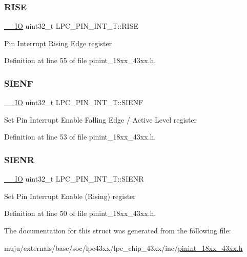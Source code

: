 \subsubsection{\texorpdfstring{R\+I\+SE}{RISE}}
{\footnotesize\ttfamily \hyperlink{core__sc300_8h_aec43007d9998a0a0e01faede4133d6be}{\+\_\+\+\_\+\+IO} uint32\+\_\+t L\+P\+C\+\_\+\+P\+I\+N\+\_\+\+I\+N\+T\+\_\+\+T\+::\+R\+I\+SE}

Pin Interrupt Rising Edge register 

Definition at line 55 of file pinint\+\_\+18xx\+\_\+43xx.\+h.

\mbox{\label{struct_l_p_c___p_i_n___i_n_t___t_ad5548753b926e10016b82652baa0e82b}} 
\subsubsection{\texorpdfstring{S\+I\+E\+NF}{SIENF}}
{\footnotesize\ttfamily \hyperlink{core__sc300_8h_aec43007d9998a0a0e01faede4133d6be}{\+\_\+\+\_\+\+IO} uint32\+\_\+t L\+P\+C\+\_\+\+P\+I\+N\+\_\+\+I\+N\+T\+\_\+\+T\+::\+S\+I\+E\+NF}

Set Pin Interrupt Enable Falling Edge / Active Level register 

Definition at line 53 of file pinint\+\_\+18xx\+\_\+43xx.\+h.

\mbox{\label{struct_l_p_c___p_i_n___i_n_t___t_ac235fcb090dfebc8b96e116c7608e1a3}} 
\subsubsection{\texorpdfstring{S\+I\+E\+NR}{SIENR}}
{\footnotesize\ttfamily \hyperlink{core__sc300_8h_aec43007d9998a0a0e01faede4133d6be}{\+\_\+\+\_\+\+IO} uint32\+\_\+t L\+P\+C\+\_\+\+P\+I\+N\+\_\+\+I\+N\+T\+\_\+\+T\+::\+S\+I\+E\+NR}

Set Pin Interrupt Enable (Rising) register 

Definition at line 50 of file pinint\+\_\+18xx\+\_\+43xx.\+h.



The documentation for this struct was generated from the following file\+:\begin{DoxyCompactItemize}
\item 
muju/externals/base/soc/lpc43xx/lpc\+\_\+chip\+\_\+43xx/inc/\hyperlink{pinint__18xx__43xx_8h}{pinint\+\_\+18xx\+\_\+43xx.\+h}\end{DoxyCompactItemize}
